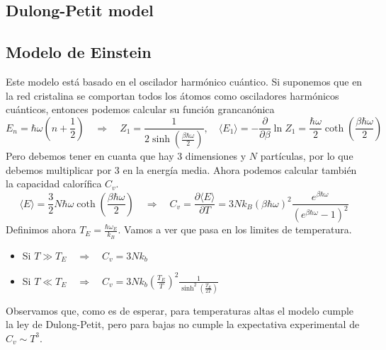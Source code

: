 \documentclass[leqno]{article}
\begin{document}
\subsection{Dulong-Petit model}
\subsection{Modelo de Einstein}
Este modelo está basado en el oscilador harmónico cuántico. Si suponemos que en la red cristalina se comportan todos los átomos como osciladores harmónicos cuánticos, entonces podemos calcular su función grancanónica
\[
  E_n = \hbar \omega (n+\frac{1}{2}) \quad \Rightarrow \quad Z_1 = \frac{1}{2 \sinh(\frac{\beta \hbar \omega }{2})}, \quad \langle E_1 \rangle = - \frac{\partial }{\partial \beta } \ln Z_1 = \frac{\hbar\omega }{2} \coth \left( \frac{\beta \hbar \omega }{2} \right) 
\] 
Pero debemos tener en cuanta que hay 3 dimensiones y $N$ partículas, por lo que debemos multiplicar por 3 en la energía media. Ahora podemos calcular también la capacidad calorífica $C_v$.
 \[
\langle E\rangle = \frac{3}{2} N \hbar \omega \coth \left( \frac{\beta \hbar \omega  }{2} \right) \quad \Rightarrow \quad
C_v = \frac{\partial \langle E\rangle}{\partial T}  = 3Nk_B (\beta \hbar \omega )^2 \frac{e^{\beta \hbar \omega }}{(e^{\beta \hbar \omega }-1)^2}
\] 
Definimos ahora $T_E = \frac{\hbar \omega_E}{k_B}$. Vamos a ver que pasa en los limites de temperatura.

\begin{itemize}[topsep=-6pt, itemsep=0pt]
  \item Si  $T\gg T_E \quad \Rightarrow \quad C_v = 3Nk_b$
  \item Si  $T\ll T_E \quad \Rightarrow \quad C_v = 3Nk_b (\frac{T_E}{T})^2 \frac{1}{\sinh ^2(\frac{T_E}{2T})}$
\end{itemize}

Observamos que, como es de esperar, para temperaturas altas el modelo cumple la ley de Dulong-Petit, pero para bajas no cumple la expectativa experimental de $C_v \sim  T^3$.
\end{document}
